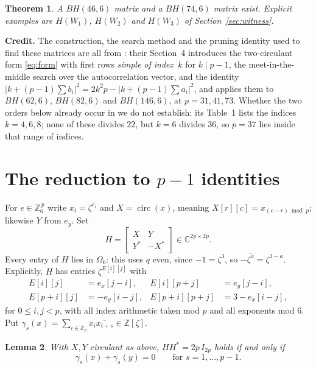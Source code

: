 \documentclass[11pt]{amsart}
\newtheorem{theorem}{Theorem}
\newtheorem{lemma}[theorem]{Lemma}
\theoremstyle{remark}
\DeclareMathOperator{\circulant}{circ}
\newcommand{\zzz}{\zeta}
\newcommand{\Om}{\Omega}
\begin{document}
\begin{theorem}\label{thm:main}
A $BH(46,6)$ matrix and a $BH(74,6)$ matrix exist. Explicit examples are
$H(W_1)$, $H(W_2)$ and $H(W_3)$ of Section~\textup{\ref{sec:witness}}.
\end{theorem}

\medskip
\noindent\textbf{Credit.} The construction, the search method and the pruning
identity used to find these matrices are all from \cite{CMS}: their Section~4
introduces the two-circulant form \eqref{eq:form} with first rows
\emph{simple of index~$k$} for $k\mid p-1$, the meet-in-the-middle search
over the autocorrelation vector, and the identity
$|k+(p-1)\sum b_i|^{2}=2k^{2}p-|k+(p-1)\sum a_i|^{2}$, and applies them to
$BH(62,6)$, $BH(82,6)$ and $BH(146,6)$, at $p=31,41,73$. Whether the two
orders below already occur in \cite{CMS} we do not establish: its Table~1
lists the indices $k=4,6,8$; none of these divides $22$, but $k=6$ divides
$36$, so $p=37$ lies inside that range of indices.

\section{The reduction to \texorpdfstring{$p-1$}{p-1}
identities}\label{sec:reduce}

For $e\in\mathbb Z_6^{\,p}$ write $x_i=\zzz^{e_i}$ and
$X=\circulant(x)$, meaning $X[r][c]=x_{(c-r)\bmod p}$; likewise $Y$ from
$e_y$. Set
\begin{equation}\label{eq:form}
 H=\begin{bmatrix} X & Y\\ Y^{*} & -X^{*}\end{bmatrix}
 \in\mathbb C^{2p\times2p}.
\end{equation}
Every entry of $H$ lies in $\Om_6$: this uses $q$ even, since
$-1=\zzz^{3}$, so $-\overline{\zzz^{a}}=\zzz^{3-a}$. Explicitly, $H$ has
entries $\zzz^{E[i][j]}$ with
\begin{equation}\label{eq:expmat}
\begin{aligned}
 E[i][j]&=e_x[j-i], & E[i][p+j]&=e_y[j-i],\\
 E[p+i][j]&=-e_y[i-j], & E[p+i][p+j]&=3-e_x[i-j],
\end{aligned}
\end{equation}
for $0\le i,j<p$, with all index arithmetic taken mod $p$ and all exponents
mod $6$. Put
$\gamma_s(x)=\sum_{i\in\mathbb Z_p}x_i\overline{x_{i+s}}\in\mathbb Z[\zzz]$.

\begin{lemma}\label{lem:reduce}
With $X,Y$ circulant as above, $HH^{*}=2p\,I_{2p}$ holds if and only if
\begin{equation}\label{eq:gam}
 \gamma_s(x)+\gamma_s(y)=0
 \qquad\text{for } s=1,\ldots,p-1 .
\end{equation}
\end{lemma}
\end{document}
